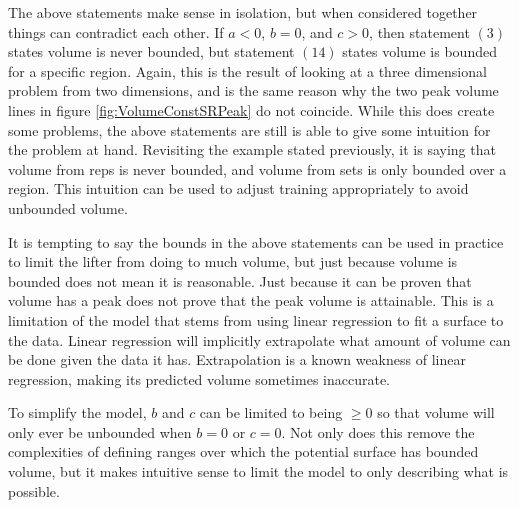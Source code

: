 The above statements make sense in isolation, but when considered together things can contradict each other. If $a<0$, $b=0$, and $c>0$, then  statement $(3)$ states volume is never bounded, but statement $(14)$ states volume is bounded for a specific region. Again, this is the result of looking at a three dimensional problem from two dimensions, and is the same reason why the two peak volume lines in figure \ref{fig:VolumeConstSRPeak} do not coincide. While this does create some problems, the above statements are still is able to give some intuition for the problem at hand. Revisiting the example stated previously, it is saying that volume from reps is never bounded, and volume from sets is only bounded over a region. This intuition can be used to adjust training appropriately to avoid unbounded volume.

It is tempting to say the bounds in the above statements can be used in practice to limit the lifter from doing to much volume, but just because volume is bounded does not mean it is reasonable. Just because it can be proven that volume has a peak does not prove that the peak volume is attainable. This is a limitation of the model that stems from using linear regression to fit a surface to the data. Linear regression will implicitly extrapolate what amount of volume can be done given the data it has. Extrapolation is a known weakness of linear regression, making its predicted volume sometimes inaccurate.

To simplify the model, $b$ and $c$ can be limited to being $\ge 0$ so that volume will only ever be unbounded when $b=0$ or $c=0$. Not only does this remove the complexities of defining ranges over which the potential surface has bounded volume, but it makes intuitive sense to limit the model to only describing what is possible.



